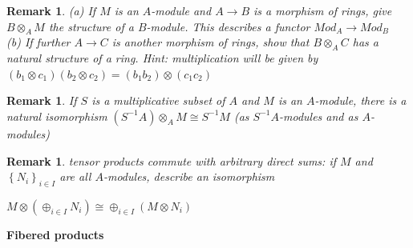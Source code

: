 \documentclass{article}
\newtheorem{remark}[theorem]{Remark}
\begin{document}
\begin{remark}
(a) If $M$ is an $A$-module and $A \rightarrow B$ is a morphism of rings, give $B \otimes_A M$ the structure of a $B$-module. This describes a functor
$Mod_A \rightarrow Mod_B$
\\
(b) If further $A \rightarrow C$ is another morphism of rings, show that $B \otimes_A C$ has a natural structure of a ring. Hint: multiplication will be given by 
$(b_1 \otimes c_1)(b_2 \otimes c_2) = (b_1b_2)\otimes(c_1c_2)$
\end{remark}
\begin{remark}
    If $S$ is a multiplicative subset of $A$ and $M$ is an $A$-module, there is a natural isomorphism $(S^{-1}A)\otimes_A M \cong S^{-1}M$ (as $S^{-1}A$-modules and as $A$-modules)
\end{remark}
\begin{remark}
     tensor products commute with arbitrary direct sums: if $M$ and $\left\{N_i\right\}_{i\in I}$ are all $A$-modules, describe an isomorphism
\begin{center}
    $M \otimes (\oplus_{i\in I}N_i)
\cong \oplus_{i\in I} (M \otimes N_i)$
\end{center}
\end{remark}

\textbf{Fibered products}
\end{document}
